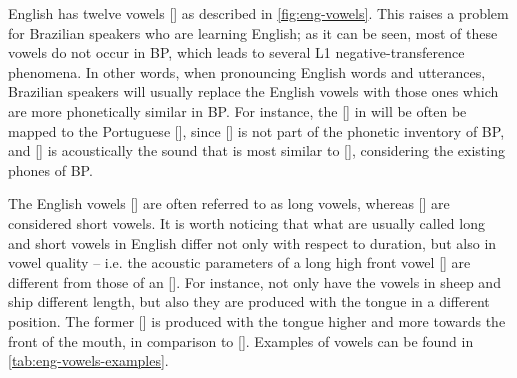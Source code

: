 English has twelve vowels [] as described in \autoref{fig:eng-vowels}. This raises a problem for Brazilian speakers who are learning English; as it can be seen, most of these vowels do not occur in \ac{BP}, which leads to several L1 negative-transference phenomena. In other words, when pronouncing English words and utterances, Brazilian speakers will usually replace the English vowels with those ones which are more phonetically similar in \ac{BP}. For instance, the [\ipa{\ae}] in  will be often be mapped to the Portuguese [], since [\ipa{\ae}] is not part of the phonetic inventory of \ac{BP}, and [] is acoustically the sound that is most similar to [\ipa{\ae}], considering the existing phones of \ac{BP}.

The English vowels [] are often referred to as long vowels, whereas [] are considered short vowels. It is worth noticing that what are usually called long and short vowels in English differ not only with respect to duration, but also in vowel quality -- i.e. the acoustic parameters of a long high front vowel [] are different from those of an []. For instance, not only have the vowels in sheep and ship different length, but also they are produced with the tongue in a different position. The former [] is produced with the tongue higher and more towards the front of the mouth, in comparison to []. Examples of vowels can be found in \autoref{tab:eng-vowels-examples}.

